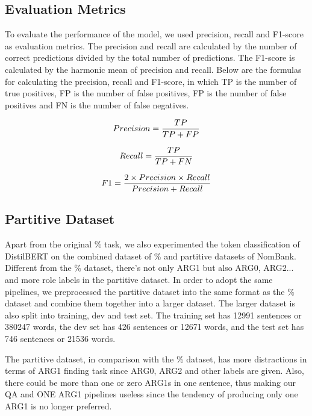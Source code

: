 \documentclass[11pt]{article}
\begin{document}
\subsection{Evaluation Metrics}

To evaluate the performance of the model, we used precision, recall and F1-score as evaluation metrics. The precision and recall are calculated by the number of correct predictions divided by the total number of predictions. The F1-score is calculated by the harmonic mean of precision and recall. Below are the formulas for calculating the precision, recall and F1-score, in which TP is the number of true positives, FP is the number of false positives, FP is the number of false positives and FN is the number of false negatives.

\begin{equation}
  Precision={TP\over{TP+FP}}
\end{equation}

\begin{equation}
  Recall={TP\over{TP+FN}}
\end{equation}

\begin{equation}
  F1={2\times{Precision}\times{Recall}\over{Precision+Recall}}
\end{equation}

\subsection{Partitive Dataset}

Apart from the original \% task, we also experimented the token classification of DistilBERT on the combined dataset of \% and partitive datasets of NomBank. Different from the \% dataset, there's not only ARG1 but also ARG0, ARG2... and more role labels in the partitive dataset. In order to adopt the same pipelines, we preprocessed the partitive dataset into the same format as the \% dataset and combine them together into a larger dataset. The larger dataset is also split into training, dev and test set. The training set has 12991 sentences or 380247 words, the dev set has 426 sentences or 12671 words, and the test set has 746 sentences or 21536 words.

The partitive dataset, in comparison with the \% dataset, has more distractions in terms of ARG1 finding task since ARG0, ARG2 and other labels are given. Also, there could be more than one or zero ARG1s in one sentence, thus making our QA and ONE ARG1 pipelines useless since the tendency of producing only one ARG1 is no longer preferred.
\end{document}
